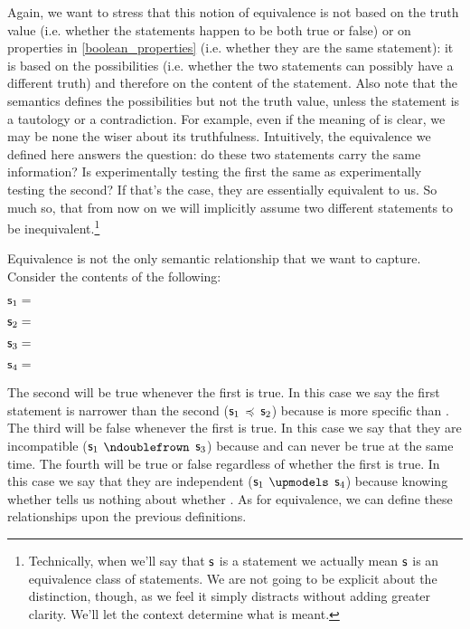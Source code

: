\documentclass[11pt,letterpaper,fleqn]{memoir} %
\begin{document}
Again, we want to stress that this notion of equivalence is not based on the truth value (i.e. whether the statements happen to be both true or false) or on properties in \ref{boolean_properties} (i.e. whether they are the same statement): it is based on the possibilities (i.e. whether the two statements can possibly have a different truth) and therefore on the content of the statement. Also note that the semantics defines the possibilities but not the truth value, unless the statement is a tautology or a contradiction. For example, even if the meaning of  is clear, we may be none the wiser about its truthfulness. Intuitively, the equivalence we defined here answers the question: do these two statements carry the same information? Is experimentally testing the first the same as experimentally testing the second? If that's the case, they are essentially equivalent to us. So much so, that from now on we will implicitly assume two different statements to be inequivalent.\footnote{Technically, when we'll say that $\mathsf{s}$ is a statement we actually mean $\mathsf{s}$ is an equivalence class of statements. We are not going to be explicit about the distinction, though, as we feel it simply distracts without adding greater clarity. We'll let the context determine what is meant.}

Equivalence is not the only semantic relationship that we want to capture. Consider the contents of the following:
\begin{description}
	\item $\mathsf{s}_1=$
	\item $\mathsf{s}_2=$
	\item $\mathsf{s}_3=$
	\item $\mathsf{s}_4=$
\end{description}
The second will be true whenever the first is true. In this case we say the first statement is narrower than the second ($\mathsf{s}_1$ $\preccurlyeq$ $\mathsf{s}_2$) because  is more specific than . The third will be false whenever the first is true. In this case we say that they are incompatible ($\mathsf{s}_1$ $\ncomp$ $\mathsf{s}_3$) because  and  can never be true at the same time. The fourth will be true or false regardless of whether the first is true. In this case we say that they are independent ($\mathsf{s}_1$ $\indep$ $\mathsf{s}_4$) because knowing whether  tells us nothing about whether . As for equivalence, we can define these relationships upon the previous definitions.
\end{document}
